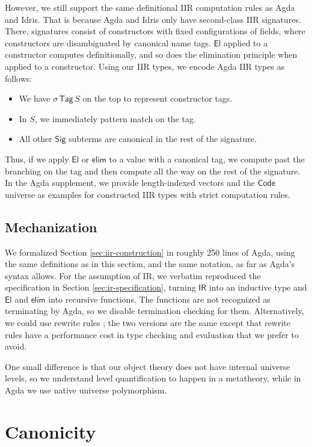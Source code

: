 \documentclass[acmsmall,screen,review,anonymous]{acmart}
\newcommand{\msf}[1]{{\mathsf{#1}}}
\newcommand{\El}{\msf{El}}
\newcommand{\Sig}{\msf{Sig}}
\newcommand{\Code}{\msf{Code}}
\newcommand{\Tag}{\msf{Tag}}
\newcommand{\IR}{\msf{IR}}
\newcommand{\elim}{\msf{elim}}
\begin{document}
However, we still support the same definitional IIR computation rules as Agda and Idris. That is
because Agda and Idris only have second-class IIR signatures. There, signatures consist of
constructors with fixed configurations of fields, where constructors are disambiguated by canonical
name tags. $\El$ applied to a constructor computes definitionally, and so does the elimination
principle when applied to a constructor. Using our IIR types, we encode Agda IIR types as follows:
\begin{itemize}
\item We have $\sigma\,\Tag\,S$ on the top to represent constructor tags.
\item In $S$, we immediately pattern match on the tag.
\item All other $\Sig$ subterms are canonical in the rest of the signature.
\end{itemize}
Thus, if we apply $\El$ or $\elim$ to a value with a canonical tag, we compute past the branching on
the tag and then compute all the way on the rest of the signature. In the Agda supplement, we provide
length-indexed vectors and the $\Code$ universe as examples for constructed IIR types with strict
computation rules.

\subsection{Mechanization}

We formalized Section \ref{sec:iir-construction} in roughly 250 lines of Agda, using the same
definitions as in this section, and the same notation, as far as Agda's syntax allows. For the
assumption of IR, we verbatim reproduced the specification in Section \ref{sec:ir-specification},
turning $\IR$ into an inductive type and $\El$ and $\elim$ into recursive functions. The functions
are not recognized as terminating by Agda, so we disable termination checking for
them. Alternatively, we could use rewrite rules \cite{DBLP:journals/pacmpl/CockxTW21}; the two
versions are the same except that rewrite rules have a performance cost in type checking and
evaluation that we prefer to avoid.

One small difference is that our object theory does not have internal universe levels, so we
understand level quantification to happen in a metatheory, while in Agda we use native universe
polymorphism.

\section{Canonicity}\label{sec:canonicity}
\end{document}
